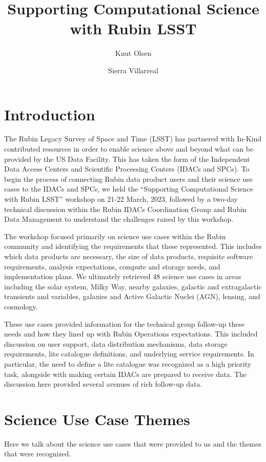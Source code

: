 \documentclass[OPS,authoryear,toc]{lsstdoc}
\title{Supporting Computational Science with Rubin LSST}
\author{%
Knut Olsen\\
\and
Sierra Villarreal\\
}
\date{\vcsDate}
\begin{document}
\maketitle

\section{Introduction}
The Rubin Legacy Survey of Space and Time (LSST) has partnered with In-Kind contributed resources in order to enable science above and beyond what can be provided by the US Data Facility. This has taken the form of the Independent Data Access Centers and Scientific Processing Centers (IDACs and SPCs). To begin the process of connecting Rubin data product users and their science use cases to the IDACs and SPCs, we held the ``Supporting Computational Science with Rubin LSST'' workshop on 21-22 March, 2023, followed by a two-day technical discussion within the Rubin IDACs Coordination Group and Rubin Data Management to understand the challenges raised by this workshop.

The workshop focused primarily on science use cases within the Rubin community and identifying the requirements that these represented. This includes which data products are necessary, the size of data products, requisite software requirements, analysis expectations, compute and storage needs, and implementation plans. We ultimately retrieved 48 science use cases in areas including the solar system, Milky Way, nearby galaxies, galactic and extragalactic transients and variables, galaxies and Active Galactic Nuclei (AGN), lensing, and cosmology.

These use cases provided information for the technical group follow-up these needs and how they lined up with Rubin Operations expectations. This included discussion on user support, data distribution mechanisms, data storage requirements, lite catalogue definitions, and underlying service requirements. In particular, the need to define a lite catalogue was recognized as a high priority task, alongside with making certain IDACs are prepared to receive data. The discussion here provided several avenues of rich follow-up data.

\section{Science Use Case Themes}
Here we talk about the science use cases that were provided to us and the themes that were recognized.
\end{document}
